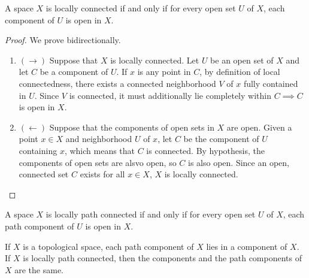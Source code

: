     \begin{theorem}
      A space $X$ is locally connected if and only if for every open set $U$ of $X$, each component of $U$ is open in $X$. 
    \end{theorem}
    \begin{proof}
      We prove bidirectionally. 
      \begin{enumerate}
        \item $(\rightarrow)$ Suppose that $X$ is locally connected. Let $U$ be an open set of $X$ and let $C$ be a component of $U$. If $x$ is any point in $C$, by definition of local connectedness, there exists a connected neighborhood $V$ of $x$ fully contained in $U$. Since $V$ is connected, it must additionally lie completely within $C \implies C$ is open in $X$. 
        \item $(\leftarrow)$ Suppose that the components of open sets in $X$ are open. Given a point $x \in X$ and neighborhood $U$ of $x$, let $C$ be the component of $U$ containing $x$, which means that $C$ is connected. By hypothesis, the components of open sets are alsvo open, so $C$ is also open. Since an open, connected set $C$ exists for all $x \in X$, $X$ is locally connected. 
      \end{enumerate}
    \end{proof}

    \begin{theorem}
      A space $X$ is locally path connected if and only if for every open set $U$ of $X$, each path component of $U$ is open in $X$.
    \end{theorem}

    \begin{theorem}
      If $X$ is a topological space, each path component of $X$ lies in a component of $X$. If $X$ is locally path connected, then the components and the path components of $X$ are the same. 
    \end{theorem}

